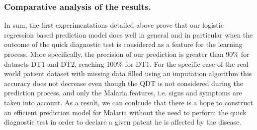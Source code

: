 \subsubsection{Comparative analysis of the results.}
In sum, the first experimentations detailed above prove that our logistic regression based prediction model does well in general and in particular when the outcome 
of the quick diagnostic test is considered as a feature for the learning process. More specifically, the precision of our prediction is greater than 90\% for datasets DT1 and DT2,
reaching 100\% for DT1. For the specific case of the real-world patient dataset with missing data filled using an imputation algorithm this accuracy does not decrease even though the QDT
is not considered during the prediction process, and only the Malaria features, i.e. signs and symptoms are taken into account. As a result, we can conlcude that there is a hope to 
construct an efficient prediction model for Malaria without the need to perform the quick diagnostic test in order to declare a given patent he is affected by the disease. 
